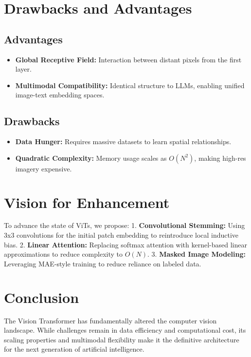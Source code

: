 \documentclass[twocolumn,10pt]{article}
\begin{document}
\section{Drawbacks and Advantages}
\subsection{Advantages}
\begin{itemize}
    \item \textbf{Global Receptive Field:} Interaction between distant pixels from the first layer.
    \item \textbf{Multimodal Compatibility:} Identical structure to LLMs, enabling unified image-text embedding spaces.
\end{itemize}

\subsection{Drawbacks}
\begin{itemize}
    \item \textbf{Data Hunger:} Requires massive datasets to learn spatial relationships.
    \item \textbf{Quadratic Complexity:} Memory usage scales as $O(N^2)$, making high-res imagery expensive.
\end{itemize}

\section{Vision for Enhancement}
To advance the state of ViTs, we propose:
1. \textbf{Convolutional Stemming:} Using 3x3 convolutions for the initial patch embedding to reintroduce local inductive bias.
2. \textbf{Linear Attention:} Replacing softmax attention with kernel-based linear approximations to reduce complexity to $O(N)$.
3. \textbf{Masked Image Modeling:} Leveraging MAE-style training to reduce reliance on labeled data.

\section{Conclusion}
The Vision Transformer has fundamentally altered the computer vision landscape. While challenges remain in data efficiency and computational cost, its scaling properties and multimodal flexibility make it the definitive architecture for the next generation of artificial intelligence.
\end{document}
